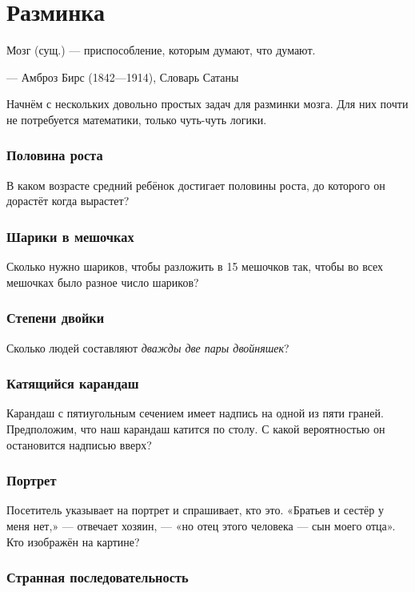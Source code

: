 \chapter{Разминка}


\setlength{\epigraphwidth}{.80\textwidth}
\epigraph{Мозг (сущ.) --- приспособление, которым думают, что думают.}{--- Амброз Бирс (1842---1914), Словарь Сатаны}

Начнём с нескольких довольно простых задач для разминки мозга.
Для них почти не потребуется математики, только чуть-чуть логики.

\subsection*{Половина роста}

В каком возрасте средний ребёнок достигает половины роста, до которого он дорастёт когда вырастет?

\subsection*{Шарики в мешочках}

Сколько нужно шариков, чтобы разложить в 15 мешочков так,
чтобы во всех мешочках было разное число шариков?

\subsection*{Степени двойки}

Сколько людей составляют \emph{дважды две пары двойняшек}?

\subsection*{Катящийся карандаш}

Карандаш с пятиугольным сечением имеет надпись на одной из пяти граней.
Предположим, что наш карандаш катится по столу.
С какой вероятностью он остановится надписью вверх?

\subsection*{Портрет}

Посетитель указывает на портрет и спрашивает, кто это. 
«Братьев и сестёр у меня нет,» --- отвечает хозяин, --- «но отец этого человека --- сын моего отца».
Кто изображён на картине?

\subsection*{Странная последовательность}

